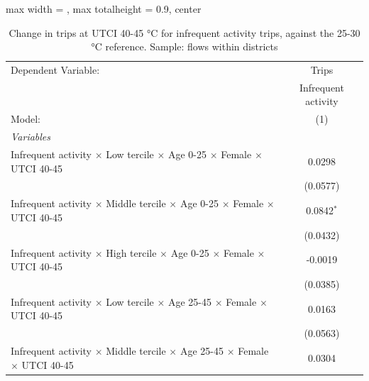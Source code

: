 
\begin{table}[htbp]
   \caption{\label{table_intersectionality_infrequent_activity_40-45} Change in trips at UTCI 40-45 °C for infrequent activity trips, against the 25-30 °C reference. Sample: flows within districts}
   \centering
   \small
   \begin{adjustbox}{max width = \textwidth, max totalheight = 0.9\textheight, center}
      \begin{tabular}{lc}
         \tabularnewline \midrule \midrule
         Dependent Variable:                                                                                     & Trips\\  
                                                                                                                 & Infrequent activity \\   
         Model:                                                                                                  & (1)\\  
         \midrule
         \emph{Variables}\\
         Infrequent activity $\times$ Low tercile $\times$ Age 0-25 $\times$ Female $\times$ UTCI 40-45          & 0.0298\\   
                                                                                                                 & (0.0577)\\   
         Infrequent activity $\times$ Middle tercile $\times$ Age 0-25 $\times$ Female $\times$ UTCI 40-45       & 0.0842$^{*}$\\   
                                                                                                                 & (0.0432)\\   
         Infrequent activity $\times$ High tercile $\times$ Age 0-25 $\times$ Female $\times$ UTCI 40-45         & -0.0019\\   
                                                                                                                 & (0.0385)\\   
         Infrequent activity $\times$ Low tercile $\times$ Age 25-45 $\times$ Female $\times$ UTCI 40-45         & 0.0163\\   
                                                                                                                 & (0.0563)\\   
         Infrequent activity $\times$ Middle tercile $\times$ Age 25-45 $\times$ Female $\times$ UTCI 40-45      & 0.0304\\   

\end{tabular}
\end{adjustbox}
\end{table}

